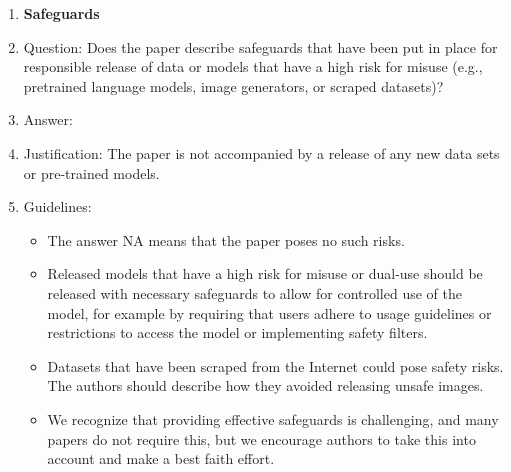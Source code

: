 \documentclass{article}
\theoremstyle{plain}
\theoremstyle{definition}
\theoremstyle{remark}
\theoremstyle{plain}
\begin{document}
\begin{enumerate}
\item {\bf Safeguards}
    \item[] Question: Does the paper describe safeguards that have been put in place for responsible release of data or models that have a high risk for misuse (e.g., pretrained language models, image generators, or scraped datasets)?
    \item[] Answer: \answerNA{} %
    \item[] Justification: The paper is not accompanied by a release of any new data sets or pre-trained models.
    \item[] Guidelines:
    \begin{itemize}
        \item The answer NA means that the paper poses no such risks.
        \item Released models that have a high risk for misuse or dual-use should be released with necessary safeguards to allow for controlled use of the model, for example by requiring that users adhere to usage guidelines or restrictions to access the model or implementing safety filters. 
        \item Datasets that have been scraped from the Internet could pose safety risks. The authors should describe how they avoided releasing unsafe images.
        \item We recognize that providing effective safeguards is challenging, and many papers do not require this, but we encourage authors to take this into account and make a best faith effort.
    \end{itemize}


\end{enumerate}
\end{document}
